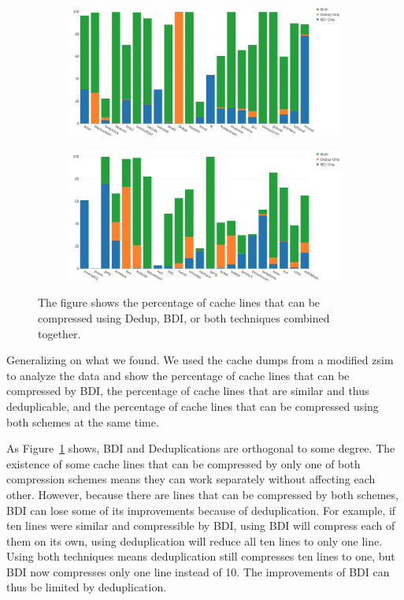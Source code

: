 \begin{figure}
    \begin{subfigure}[t]{\textwidth}
        \includegraphics[width=\textwidth]{CompPotential1.png}
    \end{subfigure}
    \begin{subfigure}[b]{\textwidth}
        \includegraphics[width=\textwidth]{CompPotential2.png}
    \end{subfigure}
    \caption[Compressible lines]{The figure shows the percentage of cache lines that can be compressed using Dedup, BDI, or both techniques combined together.}
    \label{fig:CompPossibility}
\end{figure}
Generalizing on what we found. We used the cache dumps from a modified zsim\cite{zsim} to analyze the data and show the percentage of cache lines that can be compressed by BDI, the percentage of cache lines that are similar and thus deduplicable, and the percentage of cache lines that can be compressed using both schemes at the same time.\par
As Figure~\ref{fig:CompPossibility} shows, BDI and Deduplications are orthogonal to some degree. The existence of some cache lines that can be compressed by only one of both compression schemes means they can work separately without affecting each other. However, because there are lines that can be compressed by both schemes, BDI can lose some of its improvements because of deduplication. For example, if ten lines were similar and compressible by BDI, using BDI will compress each of them on its own, using deduplication will reduce all ten lines to only one line. Using both techniques means deduplication still compresses ten lines to one, but BDI now compresses only one line instead of 10. The improvements of BDI can thus be limited by deduplication.\par
